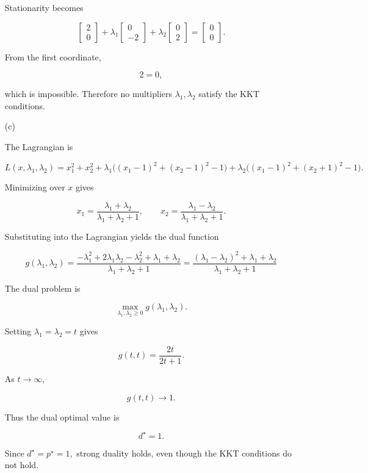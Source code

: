 \documentclass[
	12pt,
]{fphw}
\begin{document}
\begin{enumerate}
Stationarity becomes

\[
\begin{bmatrix}
2\\
0
\end{bmatrix}
+
\lambda_1
\begin{bmatrix}
0\\
-2
\end{bmatrix}
+
\lambda_2
\begin{bmatrix}
0\\
2
\end{bmatrix}
=
\begin{bmatrix}
0\\
0
\end{bmatrix}.
\]

From the first coordinate,

\[
2=0,
\]

which is impossible. Therefore no multipliers $\lambda_1,\lambda_2$ satisfy the KKT conditions.

\item[(c)]

The Lagrangian is

\[
L(x,\lambda_1,\lambda_2)
=
x_1^2+x_2^2
+\lambda_1\big((x_1-1)^2+(x_2-1)^2-1\big)
+\lambda_2\big((x_1-1)^2+(x_2+1)^2-1\big).
\]

Minimizing over $x$ gives

\[
x_1=\frac{\lambda_1+\lambda_2}{\lambda_1+\lambda_2+1},
\qquad
x_2=\frac{\lambda_1-\lambda_2}{\lambda_1+\lambda_2+1}.
\]

Substituting into the Lagrangian yields the dual function

\[
g(\lambda_1,\lambda_2)
=
\frac{-\lambda_1^2+2\lambda_1\lambda_2-\lambda_2^2+\lambda_1+\lambda_2}
{\lambda_1+\lambda_2+1}
= \frac{(\lambda_1-\lambda_2)^2+\lambda_1+\lambda_2}{\lambda_1+\lambda_2+1}
\]

The dual problem is

\[
\max_{\lambda_1,\lambda_2\ge0} g(\lambda_1,\lambda_2).
\]

Setting $\lambda_1=\lambda_2=t$ gives

\[
g(t,t)=\frac{2t}{2t+1}.
\]

As $t\to\infty$,

\[
g(t,t)\to1.
\]

Thus the dual optimal value is

\[
d^\star=1.
\]

Since
$ d^\star=p^\star=1, $
strong duality holds, even though the KKT conditions do not hold.

\end{enumerate}
\end{document}
